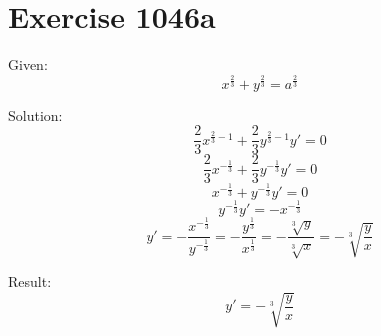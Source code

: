 \documentclass[a4paper, 10pt]{scrartcl}
\begin{document}
\section{Exercise 1046a}

Given:
\[
x^{\frac{2}{3}} + y^{\frac{2}{3}} = a^{\frac{2}{3}}
\]

Solution:
\[
\frac{2}{3}x^{\frac{2}{3} - 1} + \frac{2}{3}y^{\frac{2}{3} - 1}y' = 0
\]
\[
\frac{2}{3}x^{-\frac{1}{3}} + \frac{2}{3}y^{-\frac{1}{3}}y' = 0
\]
\[
x^{-\frac{1}{3}} + y^{-\frac{1}{3}}y' = 0
\]
\[
y^{-\frac{1}{3}}y' = -x^{-\frac{1}{3}}
\]
\[
y' = -\frac{x^{-\frac{1}{3}}}{y^{-\frac{1}{3}}} = -\frac{y^{\frac{1}{3}}}{x^{\frac{1}{3}}} = -\frac{\sqrt[3]{y}}{\sqrt[3]{x}}
= -\sqrt[3]{\frac{y}{x}}
\]

Result:
\[
y'= -\sqrt[3]{\frac{y}{x}}
\]
\end{document}
